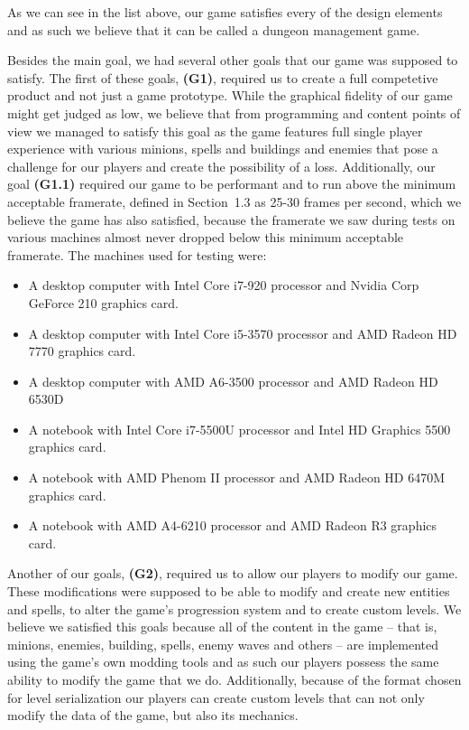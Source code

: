 As we can see in the list above, our game satisfies every of the design elements and as such we believe that it can be called a dungeon
management game.

Besides the main goal, we had several other goals that our game was supposed to satisfy. The first of these goals, \textbf{(G1)}, required
us to create a full competetive product and not just a game prototype. While the graphical fidelity of our game might get judged as low,
we believe that from programming and content points of view we managed to satisfy this goal as the game features full single player
experience with various minions, spells and buildings and enemies that pose a challenge for our players and create the possibility of a
loss. Additionally, our goal \textbf{(G1.1)} required our game to be performant and to run above the minimum acceptable framerate,
defined in Section~1.3 as 25-30 frames per second, which we believe the game has also satisfied, because the framerate we saw during
tests on various machines almost never dropped below this minimum acceptable framerate. The machines used for testing were:

\begin{itemize}
    \item A desktop computer with Intel Core i7-920 processor and Nvidia Corp GeForce 210 graphics card.
    \item A desktop computer with Intel Core i5-3570 processor and AMD Radeon HD 7770 graphics card.
    \item A desktop computer with AMD A6-3500 processor and AMD Radeon HD 6530D
    \item A notebook with Intel Core i7-5500U processor and Intel HD Graphics 5500 graphics card.
    \item A notebook with AMD Phenom II processor and AMD Radeon HD 6470M graphics card.
    \item A notebook with AMD A4-6210 processor and AMD Radeon R3 graphics card.
\end{itemize}

Another of our goals, \textbf{(G2)}, required us to allow our players to modify our game. These modifications were supposed to be able
to modify and create new entities and spells, to alter the game's progression system and to create custom levels.
We believe we satisfied this goals because all of the content in the game -- that is, minions, enemies, building, spells, enemy waves and
others -- are implemented using the game's own modding tools and as such our players possess the same ability to modify the game that
we do. Additionally, because of the format chosen for level serialization our players can create custom levels that can not only
modify the data of the game, but also its mechanics.

